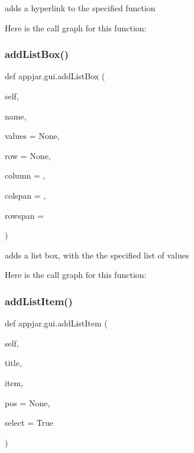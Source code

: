 \begin{DoxyVerb}adds a hyperlink to the specified function \end{DoxyVerb}
 Here is the call graph for this function\+:
\mbox{\label{classappjar_1_1gui_a94fe73471588d0cde12bc20fdb1093a5}} 
\subsubsection{\texorpdfstring{add\+List\+Box()}{addListBox()}}
{\footnotesize\ttfamily def appjar.\+gui.\+add\+List\+Box (\begin{DoxyParamCaption}\item[{}]{self,  }\item[{}]{name,  }\item[{}]{values = {\ttfamily None},  }\item[{}]{row = {\ttfamily None},  }\item[{}]{column = {},  }\item[{}]{colspan = {},  }\item[{}]{rowspan = {} }\end{DoxyParamCaption})}

\begin{DoxyVerb}adds a list box, with the the specified list of values \end{DoxyVerb}
 Here is the call graph for this function\+:
\mbox{\label{classappjar_1_1gui_aea7ae8939f18af91fc3e526becca0e96}} 
\subsubsection{\texorpdfstring{add\+List\+Item()}{addListItem()}}
{\footnotesize\ttfamily def appjar.\+gui.\+add\+List\+Item (\begin{DoxyParamCaption}\item[{}]{self,  }\item[{}]{title,  }\item[{}]{item,  }\item[{}]{pos = {\ttfamily None},  }\item[{}]{select = {\ttfamily True} }\end{DoxyParamCaption})}

